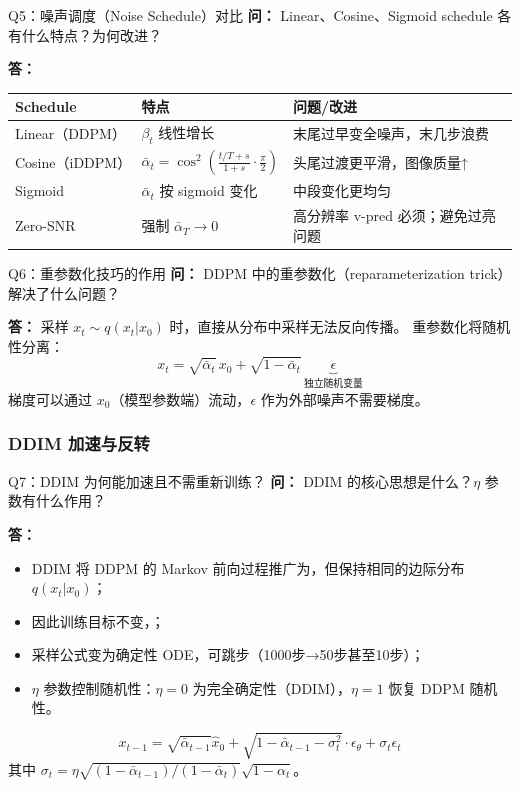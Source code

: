 \begin{conceptbox}{Q5：噪声调度（Noise Schedule）对比}
\textbf{问：} Linear、Cosine、Sigmoid schedule 各有什么特点？为何改进？

\textbf{答：}
\begin{center}
\begin{tabular}{lll}
\hline
\textbf{Schedule} & \textbf{特点} & \textbf{问题/改进} \\ \hline
Linear（DDPM）& $\beta_t$ 线性增长 & 末尾过早变全噪声，末几步浪费 \\
Cosine（iDDPM）& $\bar\alpha_t\!=\!\cos^2\!\left(\frac{t/T+s}{1+s}\cdot\frac{\pi}{2}\right)$ & 头尾过渡更平滑，图像质量↑ \\
Sigmoid & $\bar\alpha_t$ 按 sigmoid 变化 & 中段变化更均匀 \\
Zero-SNR & 强制 $\bar\alpha_T\to0$ & 高分辨率 v-pred 必须；避免过亮问题 \\
\hline
\end{tabular}
\end{center}
\end{conceptbox}

\begin{conceptbox}{Q6：重参数化技巧的作用}
\textbf{问：} DDPM 中的重参数化（reparameterization trick）解决了什么问题？

\textbf{答：}
采样 $x_t \sim q(x_t|x_0)$ 时，直接从分布中采样无法反向传播。
重参数化将随机性分离：
\[
  x_t = \sqrt{\bar\alpha_t}\,x_0 + \sqrt{1-\bar\alpha_t}\,\underbrace{\epsilon}_{\text{独立随机变量}}
\]
梯度可以通过 $x_0$（模型参数端）流动，$\epsilon$ 作为外部噪声不需要梯度。
\end{conceptbox}

\subsubsection{DDIM 加速与反转}

\begin{conceptbox}{Q7：DDIM 为何能加速且不需重新训练？}
\textbf{问：} DDIM 的核心思想是什么？$\eta$ 参数有什么作用？

\textbf{答：}
\begin{itemize}
  \item DDIM 将 DDPM 的 Markov 前向过程推广为，但保持相同的边际分布 $q(x_t|x_0)$；
  \item 因此训练目标不变，；
  \item 采样公式变为确定性 ODE，可跳步（1000步→50步甚至10步）；
  \item $\eta$ 参数控制随机性：$\eta=0$ 为完全确定性（DDIM），$\eta=1$ 恢复 DDPM 随机性。
\end{itemize}
\[
  x_{t-1} = \sqrt{\bar\alpha_{t-1}}\hat x_0 + \sqrt{1-\bar\alpha_{t-1}-\sigma_t^2}\cdot\epsilon_\theta + \sigma_t\epsilon_t
\]
其中 $\sigma_t = \eta\sqrt{(1-\bar\alpha_{t-1})/(1-\bar\alpha_t)}\sqrt{1-\alpha_t}$。
\end{conceptbox}

